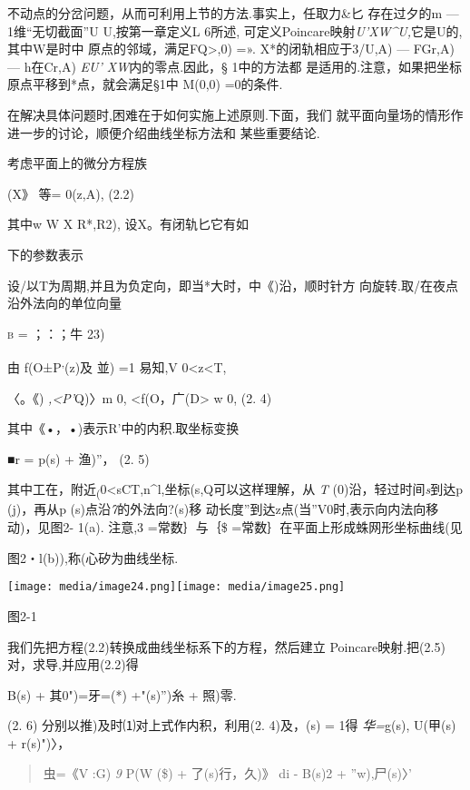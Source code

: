 \documentclass{article}
\begin{document}
不动点的分岔问题，从而可利用上节的方法.事实上，任取力\&匕 存在过夕的m
--- 1维``无切截面''U U,按第一章定义L 6所述,
可定义Poincare映射\emph{U'XW\^{}U,}它是U的,其中W是时中
原点的邻域，满足FQ\textgreater{},0) =». X*的闭轨相应于3/U,A) --- FGr,A)
--- h在Cr,A) \emph{EU' XW}内的零点.因此，§ 1中的方法都
是适用的.注意，如果把坐标原点平移到*点，就会满足§1中 M(0,0) =0的条件.

在解决具体问题时,困难在于如何实施上述原则.下面，我们
就平面向量场的情形作进一步的讨论，顺便介绍曲线坐标方法和 某些重要结论.

考虑平面上的微分方程族

(X》 等= 0(z,A), (2.2)

其中w W X R*,R2), 设X。有闭轨匕它有如

下的参数表示

设/以T为周期,并且为负定向，即当*大时，中《)沿，顺时针方
向旋转.取/在夜点沿外法向的单位向量

\textsc{b =} ；：；牛 23)

由 f(O±P\textsuperscript{,}(z)及 \textbar{}並)\textbar{} =1 易知,V
0\textless{}z\textless{}T,

〈。《) \emph{,\textless{}P'}Q)〉m 0, \textless{}f(O，广(D\textgreater{}
w 0, (2. 4)

其中《•，•)表示R'中的内积.取坐标变换

■r = p(s) + 渔)''， (2. 5)

其中工在，附近\textsubscript{(}0\textless{}sCT,\textbar{}n\textbar{}\^{}l,坐标(s,Q可以这样理解，从
\emph{T} (0)沿，轻过时间\emph{s}到达p (j)，再从p
(s)点沿\emph{7}的外法向?(s)移
动长度''到达z点(当''V0时,表示向内法向移动)，见图2- 1(a). 注意,3
=常数｝与｛\$ =常数｝在平面上形成蛛网形坐标曲线(见

图2・l(b)),称(心矽为曲线坐标.

\texttt{[image: media/image24.png]}\texttt{[image: media/image25.png]}

图2-1

我们先把方程(2.2)转换成曲线坐标系下的方程，然后建立
Poincare映射.把(2.5)对，求导,并应用(2.2)得

B(s) + 其0")=牙=(*) +"(s)'')糸 + 照)零.

(2. 6) 分别以推)及时⑴对上式作内积，利用(2. 4)及\textbar{}，(s)\textbar{}
= 1得 \emph{华=}g(s), U(甲(s) + r(s)")〉，

\begin{quote}
虫={《V :G) \emph{9} P(W (\$) + 了(s)行，久)》} di - B(s)\textbar{}2 +
''w),尸(s)〉'
\end{quote}
\end{document}
